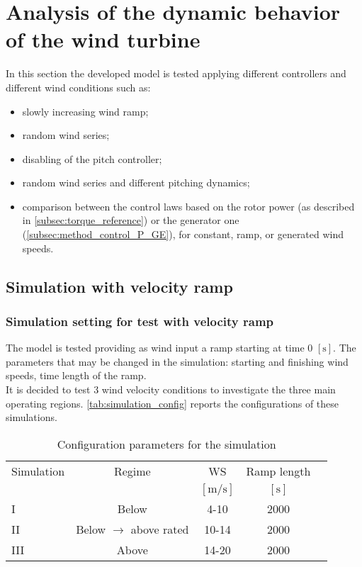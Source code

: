 \newpage
\section{Analysis of the dynamic behavior of the wind turbine}\label{sec:c_basic_model_simulation}
In this section the developed model is tested applying different controllers and different wind conditions such as:
\begin{itemize}
  \item slowly increasing wind ramp;
  \item random wind series;
  \item disabling of the pitch controller;
  \item random wind series and different pitching dynamics;
  \item comparison between the control laws based on the rotor power (as described in \autoref{subsec:torque_reference}) or the generator one (\autoref{subsec:method_control_P_GE}), for constant, ramp, or generated wind speeds.
\end{itemize}
\subsection{Simulation with velocity ramp}
\subsubsection[Simulation setting]{Simulation setting for test with velocity ramp}
The model is tested providing as wind input a ramp starting at time 0 $\left[\si{\second}\right]$. The parameters that may be changed in the simulation: starting and finishing wind speeds, time length of the ramp.\\
It is decided to test 3 wind velocity conditions to investigate the three main operating regions. \autoref{tab:simulation_config} reports the configurations of these simulations. 
\begin{table}[htb]
    \caption{Configuration parameters for the simulation}
    \centering
    \begin{tabular}{lcccc}
    \toprule
      Simulation & Regime  & WS & Ramp length \\ 
       & & $\left[\si{\meter\per\second}\right]$ & $\left[\si{\second}\right]$ \\ \midrule       
       I & Below & 4-10 & 2000  \\
       II & Below $\rightarrow$ above rated & 10-14 & 2000 \\
       III & Above & 14-20 & 2000  \\
       \bottomrule
    \end{tabular}
    \label{tab:simulation_config}
\end{table}


